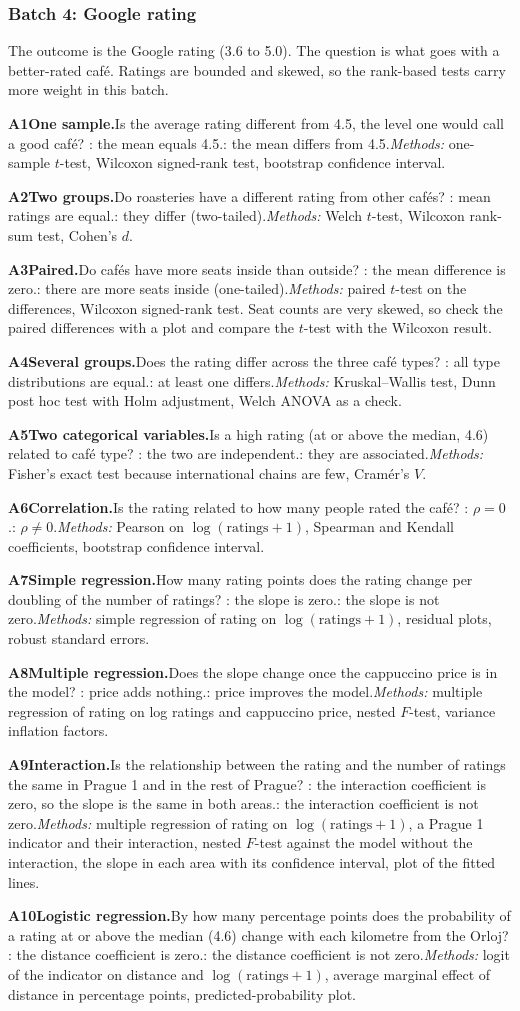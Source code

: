 \documentclass[11pt,a4paper]{article}
\newcommand{\analysis}[6]{%
  \par\smallskip\noindent\textbf{A#1\enspace #2.}\enspace #3\enspace
  \Ho: #4\enspace \Hone: #5\enspace \textit{Methods:} #6\par}
\begin{document}
\clearpage
\subsubsection{Batch 4: Google rating}

The outcome is the Google rating (3.6 to 5.0). The question is what goes with a better-rated caf\'e. Ratings are bounded and skewed, so the rank-based tests carry more weight in this batch.

\analysis{1}{One sample}{Is the average rating different from 4.5, the level one would call a good caf\'e?}{the mean equals 4.5.}{the mean differs from 4.5.}{one-sample $t$-test, Wilcoxon signed-rank test, bootstrap confidence interval.}
\analysis{2}{Two groups}{Do roasteries have a different rating from other caf\'es?}{mean ratings are equal.}{they differ (two-tailed).}{Welch $t$-test, Wilcoxon rank-sum test, Cohen's $d$.}
\analysis{3}{Paired}{Do caf\'es have more seats inside than outside?}{the mean difference is zero.}{there are more seats inside (one-tailed).}{paired $t$-test on the differences, Wilcoxon signed-rank test. Seat counts are very skewed, so check the paired differences with a plot and compare the $t$-test with the Wilcoxon result.}
\analysis{4}{Several groups}{Does the rating differ across the three caf\'e types?}{all type distributions are equal.}{at least one differs.}{Kruskal--Wallis test, Dunn post hoc test with Holm adjustment, Welch ANOVA as a check.}
\analysis{5}{Two categorical variables}{Is a high rating (at or above the median, 4.6) related to caf\'e type?}{the two are independent.}{they are associated.}{Fisher's exact test because international chains are few, Cram\'er's $V$.}
\analysis{6}{Correlation}{Is the rating related to how many people rated the caf\'e?}{$\rho=0$.}{$\rho\neq0$.}{Pearson on $\log(\text{ratings}+1)$, Spearman and Kendall coefficients, bootstrap confidence interval.}
\analysis{7}{Simple regression}{How many rating points does the rating change per doubling of the number of ratings?}{the slope is zero.}{the slope is not zero.}{simple regression of rating on $\log(\text{ratings}+1)$, residual plots, robust standard errors.}
\analysis{8}{Multiple regression}{Does the slope change once the cappuccino price is in the model?}{price adds nothing.}{price improves the model.}{multiple regression of rating on log ratings and cappuccino price, nested $F$-test, variance inflation factors.}
\analysis{9}{Interaction}{Is the relationship between the rating and the number of ratings the same in Prague 1 and in the rest of Prague?}{the interaction coefficient is zero, so the slope is the same in both areas.}{the interaction coefficient is not zero.}{multiple regression of rating on $\log(\text{ratings}+1)$, a Prague 1 indicator and their interaction, nested $F$-test against the model without the interaction, the slope in each area with its confidence interval, plot of the fitted lines.}
\analysis{10}{Logistic regression}{By how many percentage points does the probability of a rating at or above the median (4.6) change with each kilometre from the Orloj?}{the distance coefficient is zero.}{the distance coefficient is not zero.}{logit of the indicator on distance and $\log(\text{ratings}+1)$, average marginal effect of distance in percentage points, predicted-probability plot.}
\end{document}

